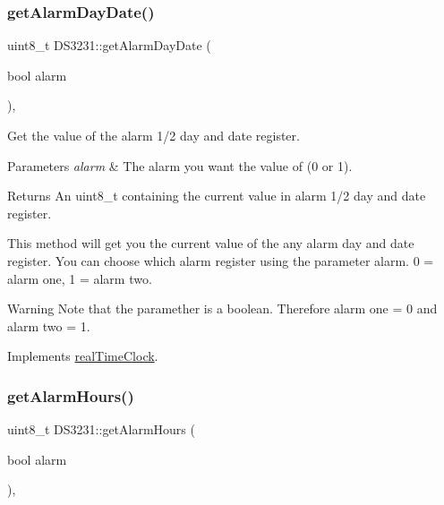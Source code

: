 \subsubsection{\texorpdfstring{get\+Alarm\+Day\+Date()}{getAlarmDayDate()}}
{\footnotesize\ttfamily uint8\+\_\+t D\+S3231\+::get\+Alarm\+Day\+Date (\begin{DoxyParamCaption}\item[{bool}]{alarm }\end{DoxyParamCaption})\hspace{0.3cm}{\ttfamily [override]}, {\ttfamily [virtual]}}



Get the value of the alarm 1/2 day and date register. 


\begin{DoxyParams}{Parameters}
{\em alarm} & The alarm you want the value of (0 or 1). \\
\hline
\end{DoxyParams}
\begin{DoxyReturn}{Returns}
An uint8\+\_\+t containing the current value in alarm 1/2 day and date register.
\end{DoxyReturn}
This method will get you the current value of the any alarm day and date register. You can choose which alarm register using the parameter alarm. 0 = alarm one, 1 = alarm two. \begin{DoxyWarning}{Warning}
Note that the paramether is a boolean. Therefore alarm one = 0 and alarm two = 1. 
\end{DoxyWarning}


Implements \mbox{\hyperlink{classreal_time_clock_afe0a54cb2f803d01df03e2ea8e86bbf9}{real\+Time\+Clock}}.

\mbox{\label{class_d_s3231_a8dc2f4546600209d16f109764c2f4434}} 
\subsubsection{\texorpdfstring{get\+Alarm\+Hours()}{getAlarmHours()}}
{\footnotesize\ttfamily uint8\+\_\+t D\+S3231\+::get\+Alarm\+Hours (\begin{DoxyParamCaption}\item[{bool}]{alarm }\end{DoxyParamCaption})\hspace{0.3cm}{\ttfamily [override]}, {\ttfamily [virtual]}}



